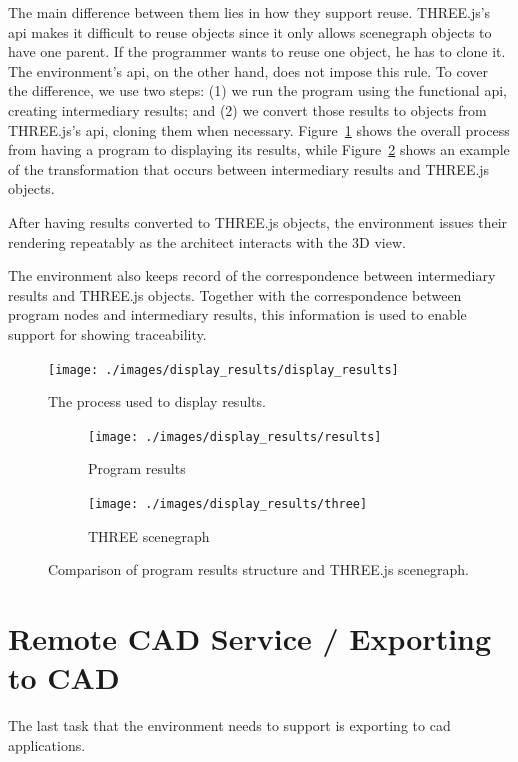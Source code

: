 The main difference between them lies in how they support reuse.
THREE.js's \gls{api} makes it difficult to reuse objects since it only allows scenegraph objects to have one parent.
If the programmer wants to reuse one object, he has to clone it.
The environment's \gls{api}, on the other hand, does not impose this rule.
To cover the difference, we use two steps:
(1) we run the program using the functional \gls{api}, creating intermediary results;
and (2) we convert those results to objects from THREE.js's \gls{api}, cloning them when necessary.
Figure~\ref{fig:display:results} shows the overall process from having a program to displaying its results, while Figure~\ref{fig:results:vs:three} shows an example of the transformation that occurs between intermediary results and THREE.js objects.

After having results converted to THREE.js objects, the environment issues their rendering repeatably as the architect interacts with the 3D view.

The environment also keeps record of the correspondence between intermediary results and THREE.js objects.
Together with the correspondence between program nodes and intermediary results, this information is used to enable support for showing traceability.

\begin{figure}
  \centering
  \texttt{[image: ./images/display\_results/display\_results]}
  \caption{The process used to display results.}
  \label{fig:display:results}
\end{figure}

\begin{figure}
  \centering
  \begin{subfigure}[b]{0.45\textwidth}
    \texttt{[image: ./images/display\_results/results]}
    \caption{Program results}
  \end{subfigure}
  \begin{subfigure}[b]{0.45\textwidth}
    \texttt{[image: ./images/display\_results/three]}
    \caption{THREE scenegraph}
  \end{subfigure}
  \caption{Comparison of program results structure and THREE.js scenegraph.}
  \label{fig:results:vs:three}
\end{figure}


\section{Remote CAD Service / Exporting to CAD}
The last task that the environment needs to support is exporting to \gls{cad} applications.

